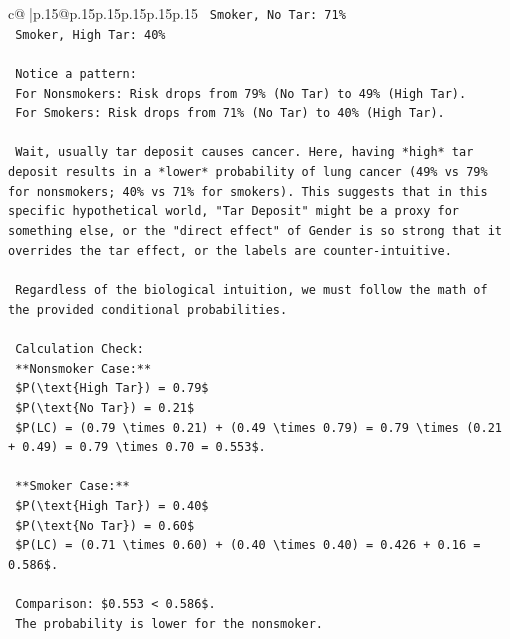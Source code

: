 \documentclass{article}
\begin{document}
{\begin{supertabular}{c@{$\;$}|p{.15\linewidth}@{}p{.15\linewidth}p{.15\linewidth}p{.15\linewidth}p{.15\linewidth}p{.15\linewidth}}
{{{\texttt{    Smoker, No Tar: 71\%} \\
\texttt{    Smoker, High Tar: 40\%} \\
\\ 
\texttt{    Notice a pattern:} \\
\texttt{    For Nonsmokers: Risk drops from 79\% (No Tar) to 49\% (High Tar).} \\
\texttt{    For Smokers: Risk drops from 71\% (No Tar) to 40\% (High Tar).} \\
\\ 
\texttt{    Wait, usually tar deposit causes cancer. Here, having *high* tar deposit results in a *lower* probability of lung cancer (49\% vs 79\% for nonsmokers; 40\% vs 71\% for smokers). This suggests that in this specific hypothetical world, "Tar Deposit" might be a proxy for something else, or the "direct effect" of Gender is so strong that it overrides the tar effect, or the labels are counter{-}intuitive.} \\
\\ 
\texttt{    Regardless of the biological intuition, we must follow the math of the provided conditional probabilities.} \\
\\ 
\texttt{    Calculation Check:} \\
\texttt{    **Nonsmoker Case:**} \\
\texttt{    \$P(\textbackslash{}text\{High Tar\}) = 0.79\$} \\
\texttt{    \$P(\textbackslash{}text\{No Tar\}) = 0.21\$} \\
\texttt{    \$P(LC) = (0.79 \textbackslash{}times 0.21) + (0.49 \textbackslash{}times 0.79) = 0.79 \textbackslash{}times (0.21 + 0.49) = 0.79 \textbackslash{}times 0.70 = 0.553\$.} \\
\\ 
\texttt{    **Smoker Case:**} \\
\texttt{    \$P(\textbackslash{}text\{High Tar\}) = 0.40\$} \\
\texttt{    \$P(\textbackslash{}text\{No Tar\}) = 0.60\$} \\
\texttt{    \$P(LC) = (0.71 \textbackslash{}times 0.60) + (0.40 \textbackslash{}times 0.40) = 0.426 + 0.16 = 0.586\$.} \\
\\ 
\texttt{    Comparison: \$0.553 < 0.586\$.} \\
\texttt{    The probability is lower for the nonsmoker.} \\
\\ 
}}}
\end{supertabular}}
\end{document}
